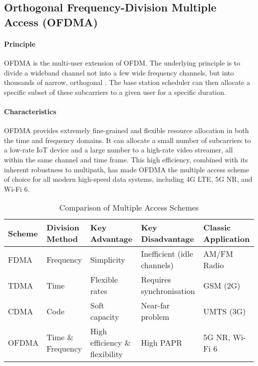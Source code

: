 \subsection{Orthogonal Frequency-Division Multiple Access (OFDMA)}

\paragraph{Principle}
OFDMA is the multi-user extension of OFDM. The underlying principle is to divide a wideband channel not into a few wide frequency channels, but into thousands of narrow, orthogonal . The base station scheduler can then allocate a specific subset of these subcarriers to a given user for a specific duration.

\paragraph{Characteristics}
OFDMA provides extremely fine-grained and flexible resource allocation in both the time and frequency domains. It can allocate a small number of subcarriers to a low-rate IoT device and a large number to a high-rate video streamer, all within the same channel and time frame. This high efficiency, combined with its inherent robustness to multipath, has made OFDMA the multiple access scheme of choice for all modern high-speed data systems, including 4G LTE, 5G NR, and Wi-Fi 6.

\begin{table}[ht]
    \centering
    \caption{Comparison of Multiple Access Schemes}
    \label{tab:ma-comparison}
    \begin{tabular}{@{}lllll@{}}
        \toprule
        \textbf{Scheme} & \textbf{Division Method} & \textbf{Key Advantage} & \textbf{Key Disadvantage} & \textbf{Classic Application} \\
        \midrule
        FDMA & Frequency & Simplicity & Inefficient (idle channels) & AM/FM Radio \\
        TDMA & Time & Flexible rates & Requires synchronisation & GSM (2G) \\
        CDMA & Code & Soft capacity & Near-far problem & UMTS (3G) \\
        OFDMA & Time \& Frequency & High efficiency \& flexibility & High PAPR & 5G NR, Wi-Fi 6 \\
        \bottomrule
    \end{tabular}
\end{table}

